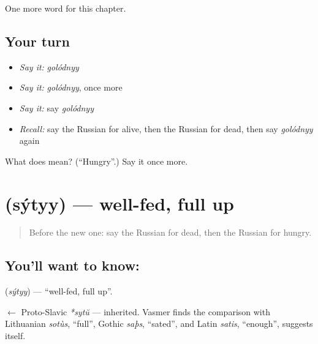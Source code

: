 \begin{grammarlens}[title={What you've built}]
One more word for this chapter.
\end{grammarlens}

\subsection*{Your turn}
\begin{itemize}
\raggedright
  \item \emph{Say it:} \emph{golódnyy}
  \item \emph{Say it:} \emph{golódnyy}, once more
  \item \emph{Say it:} say \emph{golódnyy}
  \item \emph{Recall:} say the Russian for alive, then the Russian for dead, then say \emph{golódnyy} again
\end{itemize}

\begin{tcolorbox}[breakable,colback=teal!4,colframe=teal!35!black,title={Before you move on}]
What does  mean? (\textquotedblleft{}Hungry\textquotedblright{}.) Say it once more.
\end{tcolorbox}
\section[\texorpdfstring{\ru{сытый} (sýtyy)}{сытый (sýtyy)}]{ (sýtyy) — well-fed, full up}

\label{lesson:RU-C158-sytyy}



\begin{quote}
Before the new one: say the Russian for dead, then the Russian for hungry.
\end{quote}

\subsection*{You'll want to know: }
\textbf{} (\emph{sýtyy}) — \textquotedblleft{}well-fed, full up\textquotedblright{}.

\begin{cousinweb}
\textbf{} $\leftarrow$ Proto-Slavic \emph{*sytŭ} — inherited. Vasmer finds the comparison with Lithuanian \emph{sotùs}, \textquotedblleft{}full\textquotedblright{}, Gothic \emph{saþs}, \textquotedblleft{}sated\textquotedblright{}, and Latin \emph{satis}, \textquotedblleft{}enough\textquotedblright{}, suggests itself.
\end{cousinweb}

